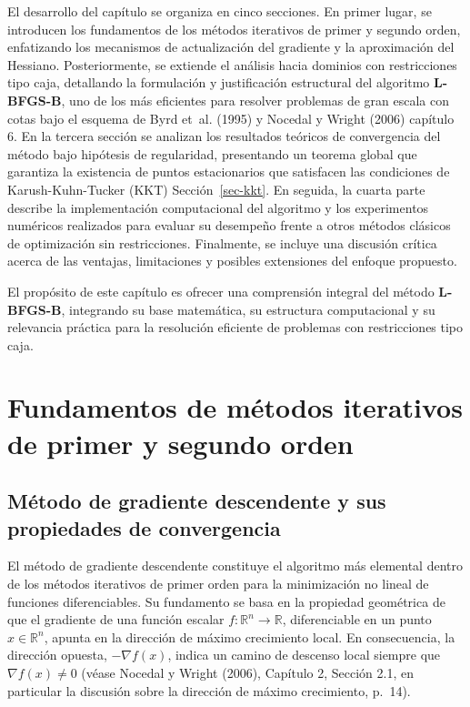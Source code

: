 \documentclass[
  spanish,
  us-letterpaper,
]{scrreprt}
\numberwithin{equation}{section}
\begin{document}
El desarrollo del capítulo se organiza en cinco secciones. En primer
lugar, se introducen los fundamentos de los métodos iterativos de primer
y segundo orden, enfatizando los mecanismos de actualización del
gradiente y la aproximación del Hessiano. Posteriormente, se extiende el
análisis hacia dominios con restricciones tipo caja, detallando la
formulación y justificación estructural del algoritmo \textbf{L-BFGS-B},
uno de los más eficientes para resolver problemas de gran escala con
cotas bajo el esquema de Byrd et~al. (1995) y Nocedal y Wright (2006)
capítulo 6. En la tercera sección se analizan los resultados teóricos de
convergencia del método bajo hipótesis de regularidad, presentando un
teorema global que garantiza la existencia de puntos estacionarios que
satisfacen las condiciones de Karush-Kuhn-Tucker (KKT)
Sección~\ref{sec-kkt}. En seguida, la cuarta parte describe la
implementación computacional del algoritmo y los experimentos numéricos
realizados para evaluar su desempeño frente a otros métodos clásicos de
optimización sin restricciones. Finalmente, se incluye una discusión
crítica acerca de las ventajas, limitaciones y posibles extensiones del
enfoque propuesto.

El propósito de este capítulo es ofrecer una comprensión integral del
método \textbf{L-BFGS-B}, integrando su base matemática, su estructura
computacional y su relevancia práctica para la resolución eficiente de
problemas con restricciones tipo caja.

\section{Fundamentos de métodos iterativos de primer y segundo
orden}\label{fundamentos-de-muxe9todos-iterativos-de-primer-y-segundo-orden}

\subsection{Método de gradiente descendente y sus propiedades de
convergencia}\label{sec-gradiente}

El método de gradiente descendente constituye el algoritmo más elemental
dentro de los métodos iterativos de primer orden para la minimización no
lineal de funciones diferenciables. Su fundamento se basa en la
propiedad geométrica de que el gradiente de una función escalar
\(f: \mathbb{R}^n \to \mathbb{R}\), diferenciable en un punto
\(x \in \mathbb{R}^n\), apunta en la dirección de máximo crecimiento
local. En consecuencia, la dirección opuesta, \(-\nabla f(x)\), indica
un camino de descenso local siempre que \(\nabla f(x) \neq 0\) (véase
Nocedal y Wright (2006), Capítulo 2, Sección 2.1, en particular la
discusión sobre la dirección de máximo crecimiento, p.~14).
\end{document}
